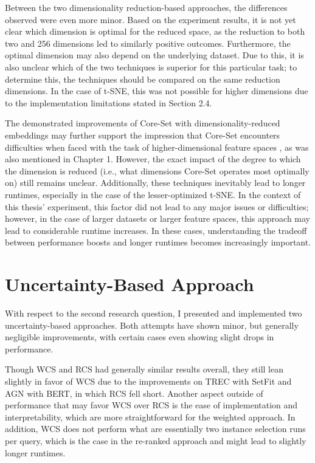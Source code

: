 \documentclass[english,bachelor,ul]{webisthesis} %
\begin{document}
Between the two dimensionality reduction-based approaches, the differences observed were even more minor. Based on the experiment results, it is not yet clear which dimension is optimal for the reduced space, as the reduction to both two and 256 dimensions led to similarly positive outcomes. Furthermore, the optimal dimension may also depend on the underlying dataset. Due to this, it is also unclear which of the two techniques is superior for this particular task; to determine this, the techniques should be compared on the same reduction dimensions. In the case of t-SNE, this was not possible for higher dimensions due to the implementation limitations stated in Section 2.4. 

The demonstrated improvements of Core-Set with dimensionality-reduced embeddings may further support the impression that Core-Set encounters difficulties when faced with the task of higher-dimensional feature spaces \citep{DBLP:conf/iccv/SinhaED19}, as was also mentioned in Chapter 1. However, the exact impact of the degree to which the dimension is reduced (i.e., what dimensions Core-Set operates most optimally on) still remains unclear. Additionally, these techniques inevitably lead to longer runtimes, especially in the case of the lesser-optimized t-SNE. In the context of this thesis' experiment, this factor did not lead to any major issues or difficulties; however, in the case of larger datasets or larger feature spaces, this approach may lead to considerable runtime increases. In these cases, understanding the tradeoff between performance boosts and longer runtimes becomes increasingly important. 

\section{Uncertainty-Based Approach}

With respect to the second research question, I presented and implemented two uncertainty-based approaches.  
Both attempts have shown minor, but generally negligible improvements, with certain cases even showing slight drops in performance. 

Though WCS and RCS had generally similar results overall, they still lean slightly in favor of WCS due to the improvements on TREC with SetFit and AGN with BERT, in which RCS fell short. Another aspect outside of performance that may favor WCS over RCS is the ease of implementation and interpretability, which are more straightforward for the weighted approach. In addition, WCS does not perform what are essentially two instance selection runs per query, which is the case in the re-ranked approach and might lead to slightly longer runtimes. 
\end{document}
